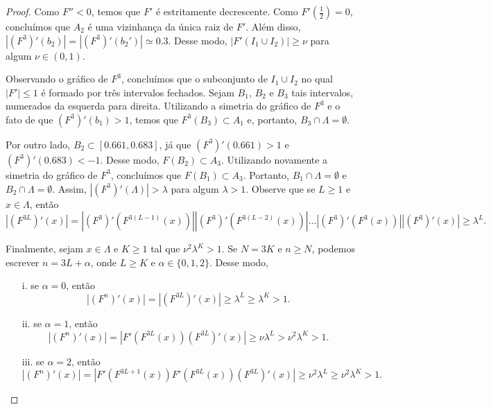 \begin{proof}
Como $F'' < 0$, temos que $F'$ é estritamente decrescente. Como $F'\left(\frac{1}{2}\right) = 0$, concluímos que $A_2$ é uma vizinhança da única raiz de $F'$. Além disso, $|(F^3)'(b_2)| = |(F^3)'(b_2')| \simeq 0.3$. Desse modo, $|F'(I_1 \cup I_2)| \geq \nu$ para algum $\nu \in (0, 1)$.

Observando o gráfico de $F^3$, concluímos que o subconjunto de $I_1 \cup I_2$ no qual $|F'| \leq 1$ é formado por três intervalos fechados. Sejam $B_1$, $B_2$ e $B_3$ tais intervalos, numerados da esquerda para direita. Utilizando a simetria do gráfico de $F^3$ e o fato de que $(F^3)'(b_1) > 1$, temos que $F^3(B_3) \subset A_1$ e, portanto, $B_3 \cap \Lambda = \emptyset$.

Por outro lado, $B_2 \subset [0.661, 0.683]$, já que $(F^3)'(0.661) > 1$ e $(F^3)'(0.683) < -1$. Desse modo, $F(B_2) \subset A_3$. Utilizando novamente a simetria do gráfico de $F^3$, concluímos que $F(B_1) \subset A_3$. Portanto, $B_1 \cap \Lambda = \emptyset$ e $B_2 \cap \Lambda = \emptyset$. Assim, $|(F^3)'(\Lambda)| > \lambda$ para algum $\lambda > 1$. Observe que se $L \geq 1$ e $x \in \Lambda$, então
$$\left| \left(F^{3L}\right)'(x) \right| = 
\left| \left( F^3 \right)' \left(F^{3(L-1)}(x)\right) \right|
\left| \left( F^3 \right)' \left(F^{3(L-2)}(x)\right) \right|
\dots
\left| \left( F^3 \right)' \left(F^3(x)\right) \right|
\left| \left( F^3 \right)' \left( x \right) \right|
\geq \lambda^L.$$

Finalmente, sejam $x \in \Lambda$ e $K \geq 1$ tal que $\nu^2 \lambda^K > 1$. Se $N = 3K$ e $n \geq N$, podemos escrever $n = 3L + \alpha$, onde $L \geq K$ e $\alpha \in \{ 0, 1, 2 \}$. Desse modo,
\begin{enumerate}
\item[i.] se $\alpha = 0$, então
$$ \left| \left(F^n\right)'(x) \right|
= \left| \left(F^{3L}\right)'(x) \right|
\geq \lambda^L \geq \lambda^K > 1.$$
\item[ii.] se $\alpha = 1$, então
$$ \left| \left(F^n\right)'(x) \right|
= \left| F' \left(F^{3L}(x) \right)
\left(F^{3L}\right)'(x) \right|
\geq \nu \lambda^L > \nu^2 \lambda^K > 1.$$
\item[iii.] se $\alpha = 2$, então
$$ \left| \left(F^n\right)'(x) \right|
= \left| F' \left(F^{3L + 1}(x) \right)
F' \left(F^{3L}(x) \right)
\left(F^{3L}\right)'(x) \right|
\geq \nu^2 \lambda^L \geq \nu^2 \lambda^K > 1.$$
\end{enumerate}


\end{proof}


